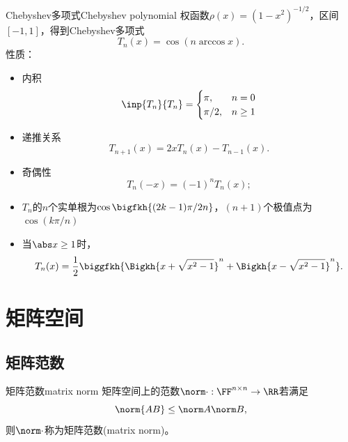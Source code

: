 \begin{example}
    {Chebyshev多项式}{Chebyshev polynomial}
    权函数$\rho(x)=(1-x^2)^{-1/2}$，区间$[-1,1]$，得到Chebyshev多项式
    \begin{equation}
        T_n(x)=\cos(n\arccos x).
    \end{equation}
    性质：
    \begin{itemize}
        \item 内积 
        \begin{equation}
            \inp{T_n}{T_n}=\begin{cases}
                \pi,&n=0\\
                \pi/2,&n\geq 1
            \end{cases}
        \end{equation}
        \item 递推关系
        \begin{equation}
            T_{n+1}(x)=2xT_n(x)-T_{n-1}(x).
        \end{equation}
        \item 奇偶性
        \begin{equation}
            T_n(-x)=(-1)^nT_n(x);
        \end{equation}
        \item $T_n$的$n$个实单根为$\cos\bigfkh{(2k-1)\pi/2n}$，$(n+1)$个极值点为$\cos(k\pi/n)$
        \item 当$\abs x\geq 1$时，
        \begin{equation}
            T_n(x)=\frac12\biggfkh{\Bigkh{x+\sqrt{x^2-1}}^n+\Bigkh{x-\sqrt{x^2-1}}^n}.
        \end{equation}
    \end{itemize}
\end{example}

\section{矩阵空间}
\label{sec:matrix space}

\subsection{矩阵范数}

\begin{definition}
    {矩阵范数}{matrix norm}
    矩阵空间上的范数$\norm\cdot:\FF^{n\times n}\to\RR$若满足
    \begin{equation}
        \norm{AB}\leq\norm A\norm B,
    \end{equation}
    则$\norm\cdot$称为矩阵范数(matrix norm)。
\end{definition}

